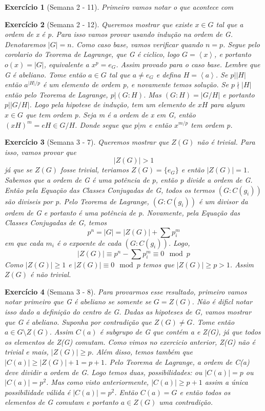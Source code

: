 \documentclass{article}
\newtheorem*{ex}{Exercício}
\begin{document}
\begin{ex}[Semana 2 - 11]
    Primeiro vamos notar o que acontece com 
\end{ex}

\begin{ex}[Semana 2 - 12]
    Queremos mostrar que existe $x \in G$ tal que a ordem de x é p.
    Para isso vamos provar usando indução na ordem de G. Denotaremos $|G|= n $.
    Como caso base, vamos verificar quando $n = p$.
    Segue pelo corolario do Teorema de Lagrange, que G é ciclico, logo $G = \left\langle x \right\rangle $, 
    e portanto $o(x) = |G|$, equivalente a $x^p = e_G$. Assim provado para o caso base.
    Lembre que G é abeliano. Tome então $a \in G$ tal que $a \neq e_G$ e defina $H = \left\langle a \right\rangle $.
    Se $p \vert |H|$ então $a^{|H|/p}$ é um elemento de ordem p, e novamente temos solução.
    Se $p \nmid |H|$ então pelo Teorema de Lagrange, $p \vert (G : H)$.
    Mas $(G : H) = |G / H|$ e portanto $p \vert | G / H|$.
    Logo pela hipotese de indução, tem um elemento de $xH$ para algum $x \in G$ que tem ordem p.
    Seja m é a ordem de x em G, então $(xH)^m=eH \in G/H$. 
    Donde segue que $p\vert m$ e então $x^{m/p}$ tem ordem p.
\end{ex}

\begin{ex}[Semana 3 - 7]
    Queremos mostrar que $Z(G)$ não é trivial.
    Para isso, vamos provar que \[|Z(G)| > 1\] já que se $Z(G)$ fosse trivial, teriamos $Z(G) = \{e_G\}$ e então $|Z(G)| = 1$.
    Sabemos que a ordem de G é uma potência de p, então p divide a ordem de G.
    Então pela Equação das Classes Conjugadas de G, todos os termos $(G:C(g_i))$ são diviseis por p.
    Pelo Teorema de Lagrange, $(G:C(g_i))$ é um divisor da ordem de G e portanto é uma potência de p. 
    Novamente, pela Equação das Classes Conjugadas de G, temos 
    \[ p^n = | G | = | Z(G) | + \sum p^m_i\]
    em que cada $m_i$ é o expoente de cada $(G:C(g_i))$.
    Logo,
    \[| Z(G) | \equiv p^n - \sum p^m_i \equiv 0 \mod p\]
    Como $| Z(G) | \geq 1$ e $| Z(G) | \equiv 0 \mod p$ temos que $| Z(G) | \geq p > 1$.
    Assim $Z(G)$ é não trivial.
\end{ex}

\begin{ex}[Semana 3 - 8]
    Para provarmos esse resultado, primeiro vamos notar primeiro que G é abeliano se somente se $G = Z(G)$.
    Não é dificl notar isso dado a definição do centro de G.
    Dadas as hipoteses de G, vamos mostrar que G é abeliano.
    Suponha por contradição que $Z(G) \neq G$. 
    Tome então $a \in G \setminus Z(G)$.
    Assim $C(a)$ é subgrupo de G que contém a e Z(G), já que todos os elementos de Z(G) comutam.
    Como vimos no exercicio anterior, Z(G) não é trivial e mais, $|Z(G)| \geq p$.
    Além disso, temos também que $|C(a)| \geq |Z(G)| + 1 = p + 1$.
    Pelo Teorema de Lagrange, a ordem de C(a) deve dividir a ordem de G.
    Logo temos duas, possibilidades: ou $|C(a)| = p$ ou $|C(a)|=p^2$. 
    Mas como visto anteriormente, $|C(a)| \geq p + 1$ assim a única possibilidade válida é $|C(a)| = p^2$.
    Então $C(a) = G$ e então todos os elementos de G comutam e portanto $a \in Z(G)$ uma contradição.
\end{ex}
\end{document}
